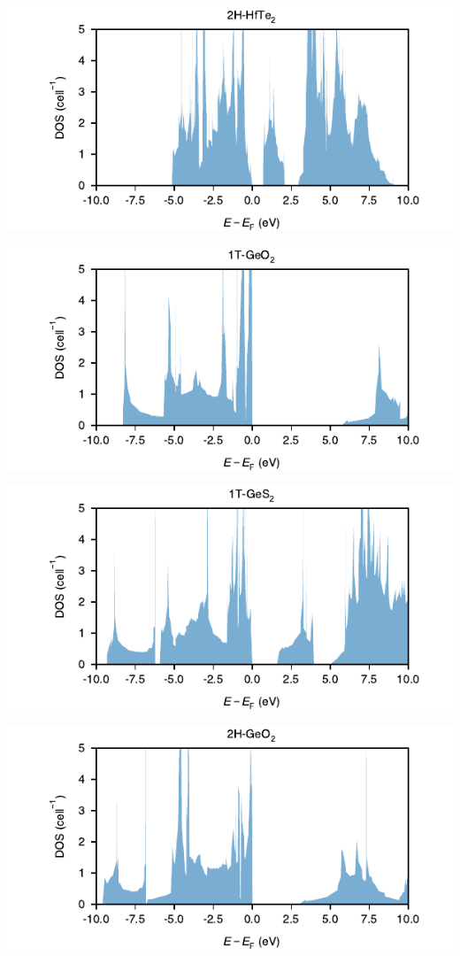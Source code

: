 \begin{center}
\includegraphics[width=.9\linewidth]{img/SI_figs/2H-HfTe2-DOS.pdf}
\end{center}
\begin{center}
\includegraphics[width=.9\linewidth]{img/SI_figs/1T-GeO2-DOS.pdf}
\end{center}
\begin{center}
\includegraphics[width=.9\linewidth]{img/SI_figs/1T-GeS2-DOS.pdf}
\end{center}
\begin{center}
\includegraphics[width=.9\linewidth]{img/SI_figs/2H-GeO2-DOS.pdf}
\end{center}
